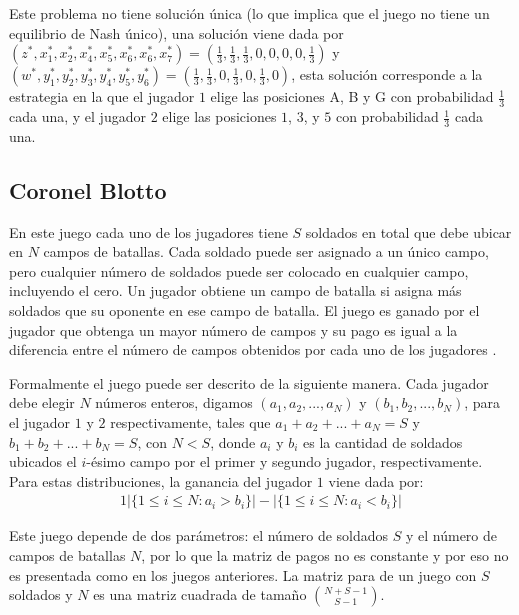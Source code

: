 Este problema no tiene solución única (lo que implica que el juego no tiene un equilibrio de Nash único), una solución viene dada por $(z^*, x^*_1, x^*_2, x^*_4, x^*_5, x^*_6, x^*_6, x^*_7) = (\frac{1}{3}, \frac{1}{3}, \frac{1}{3}, 0, 0, 0, 0, \frac{1}{3})$ y $(w^*, y^*_1, y^*_2, y^*_3,  y^*_4, y^*_5, y^*_6) = (\frac{1}{3}, \frac{1}{3}, 0, \frac{1}{3}, 0, \frac{1}{3}, 0)$, esta solución corresponde a la estrategia en la que el jugador $1$ elige las posiciones A, B y G con probabilidad $\frac{1}{3}$ cada una, y el jugador $2$ elige las posiciones $1$, $3$, y $5$ con probabilidad $\frac{1}{3}$ cada una.

\subsection{Coronel Blotto}

En este juego cada uno de los jugadores tiene $S$ soldados en total que debe ubicar en $N$ campos de batallas. Cada soldado puede ser asignado a un único campo, pero cualquier número de soldados puede ser colocado en cualquier campo, incluyendo el cero. Un jugador obtiene un campo de batalla si asigna más soldados que su oponente en ese campo de batalla. El juego es ganado por el jugador que obtenga un mayor número de campos y su pago es igual a la diferencia entre el número de campos obtenidos por cada uno de los jugadores \cite{bib:blotto-game}.

Formalmente el juego puede ser descrito de la siguiente manera. Cada jugador debe elegir $N$ números enteros, digamos $(a_1, a_2, ..., a_N)$ y $(b_1, b_2, ..., b_N)$, para el jugador $1$ y $2$ respectivamente, tales que $a_1 + a_2 + ... + a_N = S$ y $b_1 + b_2 + ... + b_N = S$, con $N < S$, donde $a_i$ y $b_i$ es la cantidad de soldados ubicados el $i$-ésimo campo por el primer y segundo jugador, respectivamente. Para estas distribuciones, la ganancia del jugador $1$ viene dada por:
\begin{alignat}{1}
|\{ 1 \leq i \leq N : a_i > b_i\}| - |\{ 1 \leq i \leq N : a_i < b_i\}|
\end{alignat}

Este juego depende de dos parámetros: el número de soldados $S$ y el número de campos de batallas $N$, por lo que la matriz de pagos no es constante y por eso no es presentada como en los juegos anteriores. La matriz para de un juego con $S$ soldados y $N$ es una matriz cuadrada de tamaño $\binom{N+S-1}{S-1}$.
